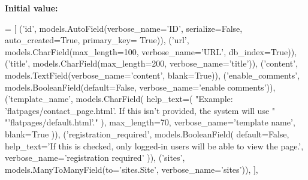 {\bfseries Initial value\+:}
\begin{DoxyCode}
= [
                (\textcolor{stringliteral}{'id'}, models.AutoField(verbose\_name=\textcolor{stringliteral}{'ID'}, serialize=\textcolor{keyword}{False}, auto\_created=\textcolor{keyword}{True}, primary\_key=\textcolor{keyword}{
      True})),
                (\textcolor{stringliteral}{'url'}, models.CharField(max\_length=100, verbose\_name=\textcolor{stringliteral}{'URL'}, db\_index=\textcolor{keyword}{True})),
                (\textcolor{stringliteral}{'title'}, models.CharField(max\_length=200, verbose\_name=\textcolor{stringliteral}{'title'})),
                (\textcolor{stringliteral}{'content'}, models.TextField(verbose\_name=\textcolor{stringliteral}{'content'}, blank=\textcolor{keyword}{True})),
                (\textcolor{stringliteral}{'enable\_comments'}, models.BooleanField(default=\textcolor{keyword}{False}, verbose\_name=\textcolor{stringliteral}{'enable comments'})),
                (\textcolor{stringliteral}{'template\_name'}, models.CharField(
                    help\_text=(
                        \textcolor{stringliteral}{"Example: 'flatpages/contact\_page.html'. If this isn't provided, the system will
       use "}
                        \textcolor{stringliteral}{"'flatpages/default.html'."}
                    ), max\_length=70, verbose\_name=\textcolor{stringliteral}{'template name'}, blank=\textcolor{keyword}{True}
                )),
                (\textcolor{stringliteral}{'registration\_required'}, models.BooleanField(
                    default=\textcolor{keyword}{False}, help\_text=\textcolor{stringliteral}{'If this is checked, only logged-in users will be able to view
       the page.'},
                    verbose\_name=\textcolor{stringliteral}{'registration required'}
                )),
                (\textcolor{stringliteral}{'sites'}, models.ManyToManyField(to=\textcolor{stringliteral}{'sites.Site'}, verbose\_name=\textcolor{stringliteral}{'sites'})),
            ],
\end{DoxyCode}
\mbox{\label{classdjango_1_1contrib_1_1flatpages_1_1migrations_1_10001__initial_1_1_migration_a939db491189788b533074c31c0f02a26}} 
